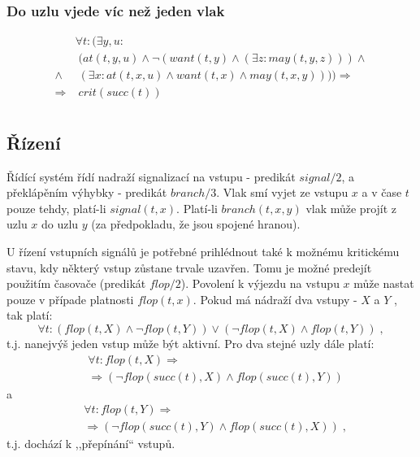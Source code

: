 \documentclass[a4paper,journal]{IEEEtran}
\begin{document}
\subsubsection{Do uzlu vjede víc než jeden vlak}
\begin{equation}
\begin{split}
&\forall t: (\exists y,u: \\
&\;(at(t,y,u) \wedge \neg (want(t,y) \wedge (\exists z: may(t,y,z)))\wedge \\
\wedge&\;(\exists x:  at(t,x,u) \wedge want(t,x) \wedge may(t,x,y)))) \Rightarrow\\
 \Rightarrow &\;crit(succ(t))\\
\end{split}
\end{equation}

\subsection{Řízení}
Řídící systém řídí nadraží signalizací na vstupu - predikát $signal/2$, 
a překlápěním výhybky - predikát $branch/3$. Vlak smí vyjet ze vstupu $x$ a v čase $t$ 
pouze tehdy, platí-li $signal(t,x)$.
Platí-li $branch(t,x,y)$ vlak může projít z uzlu $x$ do uzlu $y$ (za předpokladu, že jsou spojené hranou).

U řízení vstupních signálů je potřebné prihlédnout také k možnému kritickému stavu, kdy některý vstup
zůstane trvale uzavřen. Tomu je možné predejít použitím časovače (predikát $flop/2$). 
Povolení k výjezdu na vstupu $x$ může nastat pouze v případe platnosti $flop(t,x)$.
Pokud má nádraží dva vstupy - $X$ a $Y$ , tak platí:
\begin{equation}
\forall t: (flop(t,X)\wedge\neg flop(t,Y))\vee (\neg flop(t,X)\wedge flop(t,Y))\;,
\end{equation}
t.j. nanejvýš jeden vstup může být aktivní.
Pro dva stejné uzly dále platí:
\begin{equation}
\begin{split}
&\forall t: flop(t,X) \Rightarrow \\
&\Rightarrow(\neg flop(succ(t),X) \wedge flop(succ(t),Y))
\end{split}
\end{equation}
a
\begin{equation}
\begin{split}
&\forall t: flop(t,Y) \Rightarrow \\
&\Rightarrow(\neg flop(succ(t),Y) \wedge flop(succ(t),X))\;,
\end{split}
\end{equation}
t.j. dochází k ,,přepínání`` vstupů.
\end{document}
